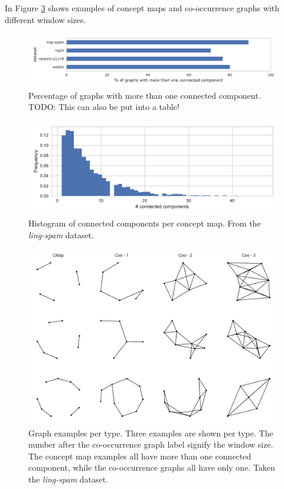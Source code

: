 In Figure \ref{fig:graph_examples} shows examples of concept maps and co-occurrence graphs with different window sizes.

\begin{figure}[ht]
\centering
\centering\includegraphics[width=1\linewidth]{assets/figures/percentage_more_than_one_connected_component.pdf}
\caption{Percentage of graphs with more than one connected component. TODO: This can also be put into a table!}\label{fig:percentage_more_than_one_connected_component}
\end{figure}

\begin{figure}[ht]
\centering
\includegraphics[width=0.8\linewidth]{assets/figures/hist-connected-components-ling-spam-CMap.pdf}
\caption{Histogram of connected components per concept map. From the \textit{ling-spam} dataset.}\label{fig:histogram_connected_components}
\end{figure}

\begin{figure}[ht]
\centering
\includegraphics[width=0.6\linewidth]{assets/figures/graph-examples.pdf}
\caption{Graph examples per type. Three examples are shown per type. The number after the co-occurrence graph label signify the window size. The concept map examples all have more than one connected component, while the co-occurrence graphs all have only one. Taken the \textit{ling-spam} dataset.}\label{fig:graph_examples}
\end{figure}

